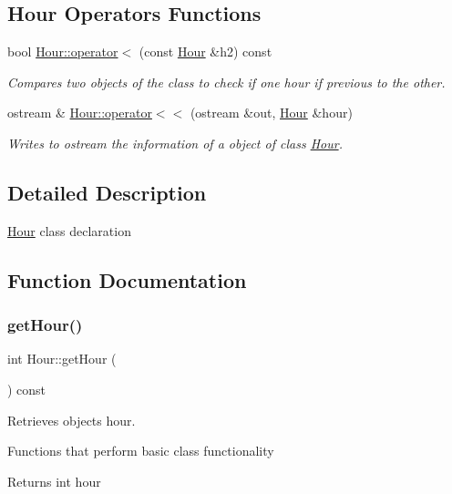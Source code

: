 \subsection*{Hour Operators Functions}
\begin{DoxyCompactItemize}
\item 
bool \hyperlink{group___hour_ga998bef44d3ea319e70f9d88ad053563b}{Hour\+::operator$<$} (const \hyperlink{class_hour}{Hour} \&h2) const
\begin{DoxyCompactList}\small\item\em Compares two objects of the class to check if one hour if previous to the other. \end{DoxyCompactList}\item 
ostream \& \hyperlink{group___hour_gac58157e808c8f449b403949cbd1b2737}{Hour\+::operator$<$$<$} (ostream \&out, \hyperlink{class_hour}{Hour} \&hour)
\begin{DoxyCompactList}\small\item\em Writes to ostream the information of a object of class \hyperlink{class_hour}{Hour}. \end{DoxyCompactList}\end{DoxyCompactItemize}


\subsection{Detailed Description}
\hyperlink{class_hour}{Hour} class declaration 

\subsection{Function Documentation}
\mbox{\label{group___hour_ga44859e9acda4578bc3cfcad5d2f25585}} 
\subsubsection{\texorpdfstring{get\+Hour()}{getHour()}}
{\footnotesize\ttfamily int Hour\+::get\+Hour (\begin{DoxyParamCaption}{ }\end{DoxyParamCaption}) const}



Retrieves object\textquotesingle{}s hour. 

Functions that perform basic class functionality \begin{DoxyReturn}{Returns}
int hour 
\end{DoxyReturn}
\mbox{\label{group___hour_gaccf1de7229b52b59d2119e9802fa3eee}} 
